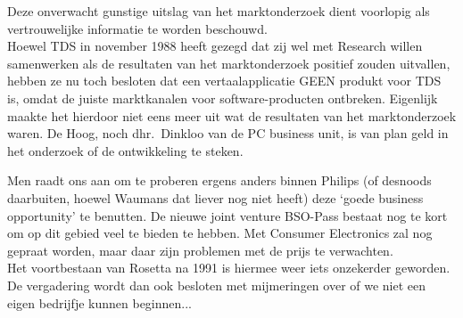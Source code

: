 Deze onverwacht gunstige uitslag van het marktonderzoek dient voorlopig als 
vertrouwelijke informatie te worden beschouwd.
\\[2 ex]
Hoewel TDS in november 1988 heeft gezegd dat zij wel met Research willen 
samenwerken als de resultaten van het marktonderzoek positief zouden uitvallen, 
hebben ze nu toch besloten dat een vertaalapplicatie GEEN 
produkt voor TDS is, omdat de juiste marktkanalen voor software-producten 
ontbreken. Eigenlijk 
maakte het hierdoor niet eens meer uit wat de 
resultaten van het marktonderzoek waren. De Hoog, noch
dhr.\ Dinkloo van de PC business unit, is van plan geld in het 
onderzoek of de ontwikkeling te steken.

Men raadt ons aan om te proberen ergens anders binnen Philips (of desnoods 
daarbuiten, hoewel Waumans dat liever nog niet heeft) deze `goede business 
opportunity' te benutten. 
De nieuwe joint venture BSO-Pass bestaat nog te kort om op dit gebied veel te 
bieden te hebben. Met Consumer Electronics zal nog gepraat worden, maar 
daar zijn problemen met de prijs te verwachten.
\\[2 ex]
Het voortbestaan van Rosetta na 1991 is hiermee weer iets onzekerder geworden.
De vergadering wordt dan ook besloten met mijmeringen over of we niet een eigen 
bedrijfje kunnen beginnen...




